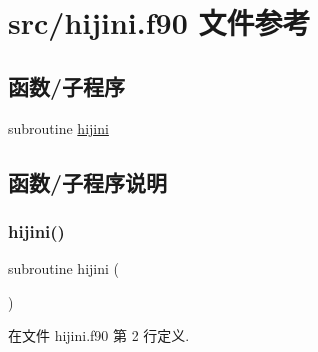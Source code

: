 \hypertarget{hijini_8f90}{}\section{src/hijini.f90 文件参考}
\label{hijini_8f90}
\subsection*{函数/子程序}
\begin{DoxyCompactItemize}
\item 
subroutine \mbox{\hyperlink{hijini_8f90_a99d63cd31d2901e4fc2a3f4b5f6bfa5a}{hijini}}
\end{DoxyCompactItemize}


\subsection{函数/子程序说明}
\mbox{\label{hijini_8f90_a99d63cd31d2901e4fc2a3f4b5f6bfa5a}} 
\subsubsection{\texorpdfstring{hijini()}{hijini()}}
{\footnotesize\ttfamily subroutine hijini (\begin{DoxyParamCaption}{ }\end{DoxyParamCaption})}



在文件 hijini.\+f90 第 2 行定义.

